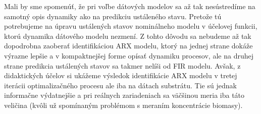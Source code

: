 Mali by sme spomenúť, že pri voľbe dátových modelov sa až tak nesústredíme na samotný opis dynamiky ako na predikciu ustáleného stavu. Pretože tú potrebujeme na úpravu ustálených stavov nominálneho modelu v účelovej funkcii, ktorú dynamika dátového modelu nezmení. Z tohto dôvodu sa nebudeme až tak dopodrobna zaoberať identifikáciou ARX modelu, ktorý na jednej strane dokáže výrazne lepšie a v kompaktnejšej forme opísať dynamiku procesov, ale na druhej strane predikcia ustálených stavov sa takmer nelíši od FIR modelu. Avšak, z didaktických účelov si ukážeme výsledok identifikácie ARX modelu v tretej iterácii optimalizačného procesu ale iba na dátach substrátu. Tie sú jednak informačne výdatnejšie a pri reálnych zariadeniach sa väčšinou meria iba táto veličina (kvôli už spomínaným problémom s meraním koncentrácie biomasy).

